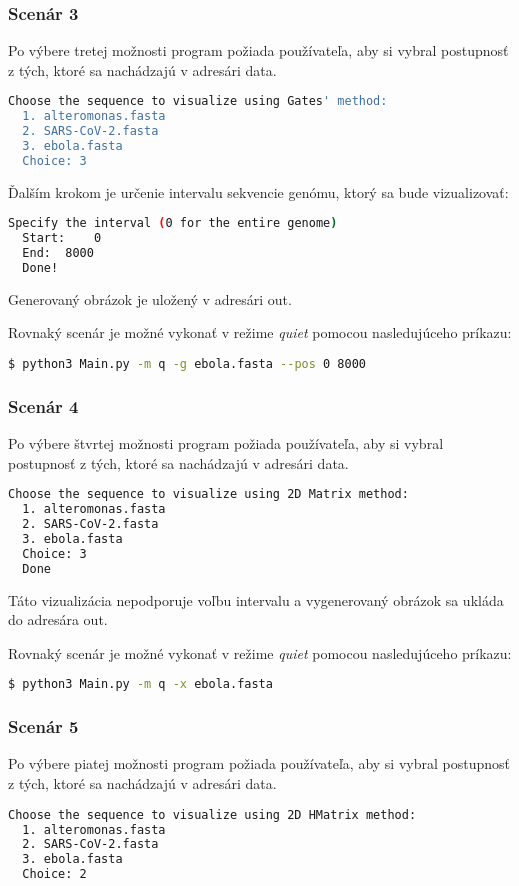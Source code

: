 \subsubsection{Scenár 3}
Po výbere tretej možnosti program požiada používateľa, aby si vybral postupnosť z tých, ktoré sa nachádzajú v adresári {\selectfont data}.
\begin{lstlisting}[language=bash]
  Choose the sequence to visualize using Gates' method:
  1. alteromonas.fasta
  2. SARS-CoV-2.fasta
  3. ebola.fasta
  Choice: 3
\end{lstlisting}
Ďalším krokom je určenie intervalu sekvencie genómu, ktorý sa bude vizualizovať:
\begin{lstlisting}[language=bash]
  Specify the interval (0 for the entire genome)
  Start:	0
  End:	8000
  Done!
\end{lstlisting}

Generovaný obrázok je uložený v adresári {\selectfont out}.

\bigskip
Rovnaký scenár je možné vykonať v režime \textit{quiet} pomocou nasledujúceho príkazu:
\begin{lstlisting}[language=bash]
  $ python3 Main.py -m q -g ebola.fasta --pos 0 8000
\end{lstlisting}

\subsubsection{Scenár 4}
Po výbere štvrtej možnosti program požiada používateľa, aby si vybral postupnosť z tých, ktoré sa nachádzajú v adresári {\selectfont data}.
\begin{lstlisting}[language=bash]
  Choose the sequence to visualize using 2D Matrix method:
  1. alteromonas.fasta
  2. SARS-CoV-2.fasta
  3. ebola.fasta
  Choice: 3
  Done
\end{lstlisting}

Táto vizualizácia nepodporuje voľbu intervalu a vygenerovaný obrázok sa ukláda do adresára {\selectfont out}.

\bigskip
Rovnaký scenár je možné vykonať v režime \textit{quiet} pomocou nasledujúceho príkazu:
\begin{lstlisting}[language=bash]
  $ python3 Main.py -m q -x ebola.fasta
\end{lstlisting}

\subsubsection{Scenár 5}
Po výbere piatej možnosti program požiada používateľa, aby si vybral postupnosť z tých, ktoré sa nachádzajú v adresári {\selectfont data}.
\begin{lstlisting}[language=bash]
  Choose the sequence to visualize using 2D HMatrix method:
  1. alteromonas.fasta
  2. SARS-CoV-2.fasta
  3. ebola.fasta
  Choice: 2
\end{lstlisting}

